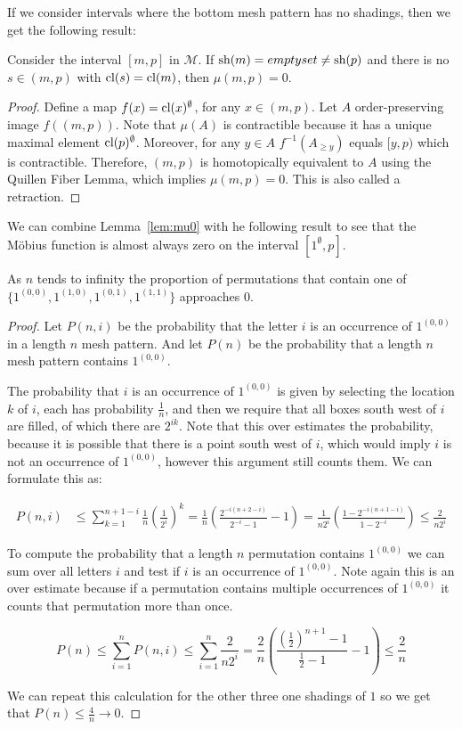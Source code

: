 \documentclass[11pt,a4paper,oneside]{article}
\begin{document}
If we consider intervals where the bottom mesh pattern has no shadings, then we
get the following result:

\begin{lem}\label{lem:mu0}
Consider the interval $[m,p]$ in $\mathcal{M}$. If $\operatorname{\textrm{sh}}(m)=emptyset\not=\operatorname{\textrm{sh}}(p)$
and there is no $s\in(m,p)$ with $\operatorname{\textrm{cl}}(s)=\operatorname{\textrm{cl}}(m)$, then $\mu(m,p)=0$.
\begin{proof}
Define a map $f(x)=\operatorname{\textrm{cl}}(x)^\emptyset$, for any $x\in(m,p)$. Let $A$
order-preserving image $f((m,p))$. Note that $\mu(A)$ is contractible because it
has a unique maximal element $\operatorname{\textrm{cl}}(p)^\emptyset$. Moreover, for any $y\in A$
$f^{-1}(A_{\ge y})$ equals $[y,p)$ which is contractible. Therefore, $(m,p)$ is
homotopically equivalent to $A$ using the Quillen Fiber Lemma, which implies
$\mu(m,p)=0$. This is also called a retraction.
\end{proof}
\end{lem}
We can combine Lemma~\ref{lem:mu0} with he following result to see that the
M\"obius function is almost always zero on the interval $[1^\emptyset,p]$.
\begin{lem}
As $n$ tends to infinity the proportion of permutations that contain one of
$\{1^{(0,0)},1^{(1,0)},1^{(0,1)},1^{(1,1)}\}$ approaches $0$.
\begin{proof}
Let $P(n,i)$ be the probability that the letter $i$ is an occurrence of
$1^{(0,0)}$ in a length $n$ mesh pattern. And let $P(n)$ be the probability that
a length $n$ mesh pattern contains $1^{(0,0)}$.

The probability that $i$ is an occurrence of $1^{(0,0)}$ is given by selecting
the location $k$ of $i$, each has probability $\frac{1}{n}$, and then we require
that all boxes south west of $i$ are filled, of which there are $2^{ik}$. Note
that this over estimates the probability, because it is possible that there is a
point south west of $i$, which would imply $i$ is not an occurrence of
$1^{(0,0)}$, however this argument still counts them. We can formulate this as:

\begin{align*}
P(n,i)&\le\sum_{k=1}^{n+1-i}\frac{1}{n}\left(\frac{1}{2^i}\right)^k=\frac{1}{n}\left(\frac{2^{-i(n+2-i)}}{2^{-i}-1}-1\right)=\frac{1}{n2^i}\left(\frac{1-2^{-i(n+1-i)}}{1-2^{-i}}\right)\le\frac{2}{n2^i}
\end{align*}

To compute the probability that a length $n$ permutation contains $1^{(0,0)}$ we
can sum over all letters $i$ and test if $i$ is an occurrence of $1^{(0,0)}$.
Note again this is an over estimate because if a permutation contains multiple
occurrences of $1^{(0,0)}$ it counts that permutation more than once.

$$P(n)\le\sum_{i=1}^{n}P(n,i)\le\sum_{i=1}^{n}\frac{2}{n2^i}=\frac{2}{n}\left(\frac{\left(\frac{1}{2}\right)^{n+1}-1}{\frac{1}{2}-1}-1\right)\le\frac{2}{n} $$

We can repeat this calculation for the other three one shadings of $1$ so we get
that $P(n)\le \frac{4}{n}\rightarrow 0$.
\end{proof}
\end{lem}
\end{document}
